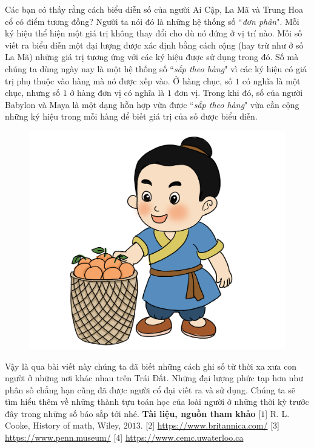 \begin{multicols}{2}
	\vskip 0.1cm
	Các bạn có thấy rằng cách biểu diễn số của người Ai Cập, La Mã và Trung Hoa cổ có điểm tương đồng? Người ta nói đó là những hệ thống số ``\textit{đơn phân}". Mỗi ký hiệu thể hiện một giá trị không thay đổi cho dù nó đứng ở vị trí nào. Mỗi số viết ra biểu diễn một đại lượng được xác định bằng cách  cộng (hay trừ như ở số La Mã) những giá trị tương ứng với các ký hiệu được sử dụng trong đó. Số mà chúng ta dùng ngày nay là một hệ thống số ``\textit{sắp theo hàng}" vì các ký hiệu có giá trị phụ thuộc vào hàng mà nó được xếp vào. Ở hàng chục, số $1$ có nghĩa là một chục, nhưng số $1$ ở hàng đơn vị có nghĩa là $1$ đơn vị. Trong khi đó, số của người Babylon và Maya là một dạng hỗn hợp vừa được ``\textit{sắp theo hàng}" vừa cần cộng những ký hiệu trong mỗi hàng để biết giá trị của số được biểu diễn.
	\begin{figure}[H]
		\centering
		\vspace*{-5pt}
		\captionsetup{labelformat= empty, justification=centering}
		\includegraphics[width=0.85\linewidth]{20.12-pi.3}
		\vspace*{-10pt}
	\end{figure}
	Vậy là qua bài viết này chúng ta đã biết những cách ghi số  từ thời xa xưa con người ở những nơi khác nhau trên Trái Đất. Những đại lượng phức tạp hơn như phân số chẳng hạn cũng đã được người cổ đại viết ra và sử dụng. Chúng ta sẽ tìm hiểu thêm về những thành tựu toán học của loài người ở những thời kỳ trước đây trong những số báo sắp tới nhé. 
	\vskip 0.1cm
	\textbf{\color{toancuabi}Tài liệu, nguồn tham khảo}
	\vskip 0.1cm
	[$1$] R. L. Cooke, History of math, Wiley, $2013$.
	\vskip 0.1cm
	[$2$] \url{https://www.britannica.com/}
	\vskip 0.1cm
	[$3$] \url{https://www.penn.museum/}
	\vskip 0.1cm
	[$4$] \url{https://www.cemc.uwaterloo.ca}
	\vskip 0.1cm
	
\end{multicols}
